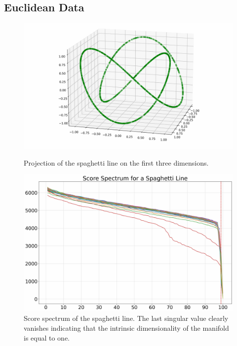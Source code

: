    \subsection{Euclidean Data}
   \label{ch3:appendix:additional_euclidean}
   
   \begin{figure}[H]
   \begin{minipage}[t]{.45\textwidth}
       \centering
       \includegraphics[width=.99\textwidth]{chapter3/figures/spaghetti.jpg}
       \caption{Projection of the spaghetti line on the first three dimensions.}
       \label{ch3:fig:line_samples}
   \end{minipage}
   \hspace{5mm}
   \begin{minipage}[t]{.45\textwidth}
       \centering
       \includegraphics[width=.99\textwidth]{chapter3/figures/line_spectrum.jpg}
       \caption{Score spectrum of the spaghetti line. The last singular value clearly vanishes indicating that the intrinsic dimensionality of the manifold is equal to one.}
       \label{ch3:fig:line}
   \end{minipage}
   \end{figure}
   
